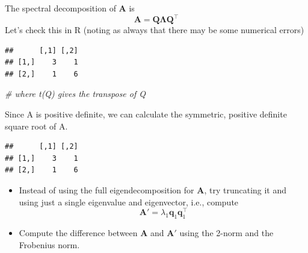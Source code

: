 \documentclass[]{book}
\newenvironment{Shaded}{\begin{snugshade}}{\end{snugshade}}
\newcommand{\CommentTok}[1]{\textcolor[rgb]{0.56,0.35,0.01}{\textit{#1}}}
\newcommand{\FloatTok}[1]{\textcolor[rgb]{0.00,0.00,0.81}{#1}}
\newcommand{\KeywordTok}[1]{\textcolor[rgb]{0.13,0.29,0.53}{\textbf{#1}}}
\newcommand{\NormalTok}[1]{#1}
\newcommand{\OperatorTok}[1]{\textcolor[rgb]{0.81,0.36,0.00}{\textbf{#1}}}
\providecommand{\tightlist}{%
  \setlength{\itemsep}{0pt}\setlength{\parskip}{0pt}}
\theoremstyle{definition}
\theoremstyle{definition}
\theoremstyle{definition}
\theoremstyle{remark}
\begin{document}
The spectral decomposition of \(\boldsymbol A\) is
\[\boldsymbol A= \boldsymbol Q\boldsymbol \Lambda\boldsymbol Q^\top\]
Let's check this in R (noting as always that there may be some numerical errors)

\begin{Shaded}
\end{Shaded}

\begin{verbatim}
##      [,1] [,2]
## [1,]    3    1
## [2,]    1    6
\end{verbatim}

\begin{Shaded}
\begin{Highlighting}[]
                                   \CommentTok{# where t(Q) gives the transpose of Q}
\end{Highlighting}
\end{Shaded}

Since A is positive definite, we can calculate the symmetric, positive definite square root of A.

\begin{Shaded}
\end{Shaded}

\begin{verbatim}
##      [,1] [,2]
## [1,]    3    1
## [2,]    1    6
\end{verbatim}

\begin{itemize}
\tightlist
\item
  Instead of using the full eigendecomposition for \(\boldsymbol A\), try truncating it and using just a single eigenvalue and eigenvector, i.e., compute
  \[\boldsymbol A' = \lambda_1 \boldsymbol q_1 \boldsymbol q_1^\top\]
\item
  Compute the difference between \(\boldsymbol A\) and \(\boldsymbol A'\) using the 2-norm and the Frobenius norm.
\end{itemize}
\end{document}

